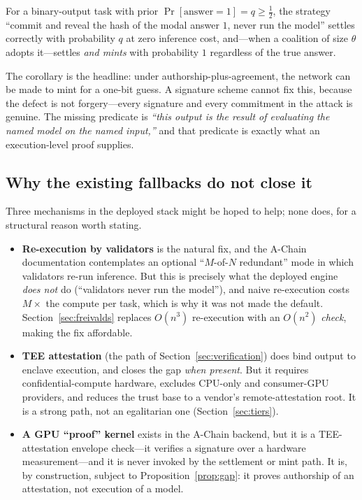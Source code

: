 \begin{corollary}
\label{cor:onebit}
For a binary-output task with prior $\Pr[\text{answer}=1]=q\ge\tfrac12$, the
strategy ``commit and reveal the hash of the modal answer $1$, never run the
model'' settles correctly with probability $q$ at zero inference cost, and---when
a coalition of size $\theta$ adopts it---settles \emph{and mints} with probability
$1$ regardless of the true answer.
\end{corollary}

The corollary is the headline: under authorship-plus-agreement, the network can be
made to mint for a one-bit guess. A signature scheme cannot fix this, because the
defect is not forgery---every signature and every commitment in the attack is
genuine. The missing predicate is \emph{``this output is the result of evaluating
the named model on the named input,''} and that predicate is exactly what an
execution-level proof supplies.

\subsection{Why the existing fallbacks do not close it}

Three mechanisms in the deployed stack might be hoped to help; none does, for a
structural reason worth stating.

\begin{itemize}[leftmargin=1.4em]
\item \textbf{Re-execution by validators} is the natural fix, and the A-Chain
documentation contemplates an optional ``$M$-of-$N$ redundant'' mode in which
validators re-run inference. But this is precisely what the deployed engine
\emph{does not} do (``validators never run the model''), and naive re-execution
costs $M\times$ the compute per task, which is why it was not made the default.
Section~\ref{sec:freivalds} replaces $O(n^3)$ re-execution with an $O(n^2)$
\emph{check}, making the fix affordable.
\item \textbf{TEE attestation} (the path of Section~\ref{sec:verification}) does
bind output to enclave execution, and closes the gap \emph{when present}. But it
requires confidential-compute hardware, excludes CPU-only and consumer-GPU
providers, and reduces the trust base to a vendor's remote-attestation root. It is
a strong path, not an egalitarian one (Section~\ref{sec:tiers}).
\item \textbf{A GPU ``proof'' kernel} exists in the A-Chain backend, but it is a
TEE-attestation envelope check---it verifies a signature over a hardware
measurement---and it is never invoked by the settlement or mint path. It is, by
construction, subject to Proposition~\ref{prop:gap}: it proves authorship of an
attestation, not execution of a model.
\end{itemize}

